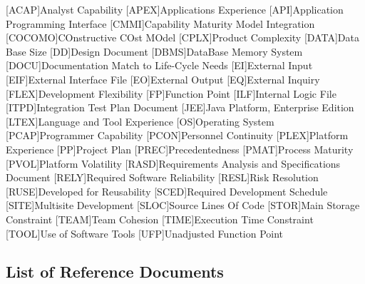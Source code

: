 \begin{acronym}[ACAP] %

[ACAP]{Analyst Capability}
[APEX]{Applications Experience}
[API]{Application Programming Interface}
[CMMI]{Capability Maturity Model Integration}
[COCOMO]{COnstructive COst MOdel}
[CPLX]{Product Complexity}
[DATA]{Data Base Size}
[DD]{Design Document}
[DBMS]{DataBase Memory System}
[DOCU]{Documentation Match to Life-Cycle Needs}
[EI]{External Input}
[EIF]{External Interface File}
[EO]{External Output}
[EQ]{External Inquiry}
[FLEX]{Development Flexibility}
[FP]{Function Point}
[ILF]{Internal Logic File}
[ITPD]{Integration Test Plan Document}
[JEE]{Java Platform, Enterprise Edition}
[LTEX]{Language and Tool Experience}
[OS]{Operating System}
[PCAP]{Programmer Capability}
[PCON]{Personnel Continuity}
[PLEX]{Platform Experience}
[PP]{Project Plan}
[PREC]{Precedentedness}
[PMAT]{Process Maturity}
[PVOL]{Platform Volatility}
[RASD]{Requirements Analysis and Specifications Document}
[RELY]{Required Software Reliability}
[RESL]{Risk Resolution}
[RUSE]{Developed for Reusability}
[SCED]{Required Development Schedule}
[SITE]{Multisite Development}
[SLOC]{Source Lines Of Code}
[STOR]{Main Storage Constraint}
[TEAM]{Team Cohesion}
[TIME]{Execution Time Constraint}
[TOOL]{Use of Software Tools}
[UFP]{Unadjusted Function Point}



\end{acronym}

\subsection{List of Reference Documents}

